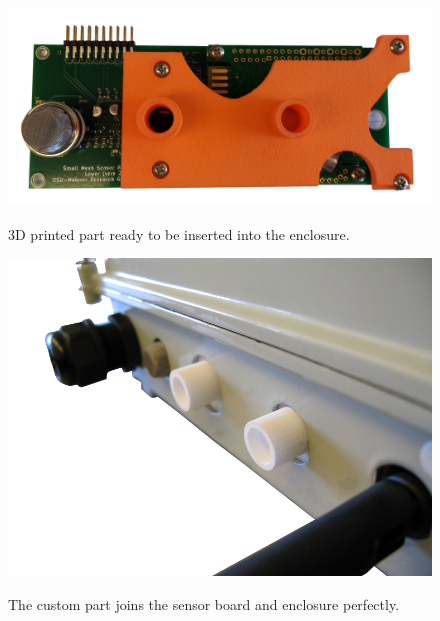 \documentclass[numbook, envcountsect, envcountsame, envcountreset, runningheads, twocolumn]{svjour3}
\begin{document}
			\begin{figure}[!t]
				\centering
				{\includegraphics[width=.8\columnwidth,height=0.8\columnwidth,keepaspectratio]{3d5.png}}
				\caption[3D printed part]{3D printed part ready to be inserted into the enclosure.\label{fig:3d5}}
			\end{figure}
			
			\begin{figure}[!t]
				\centering
				{\includegraphics[width=.8\columnwidth,height=0.8\columnwidth,keepaspectratio]{3d6.png}}
				\caption[3D printed part joins]{The custom part joins the sensor board and enclosure perfectly.\label{fig:3d6}}
			\end{figure}
		
\end{document}
